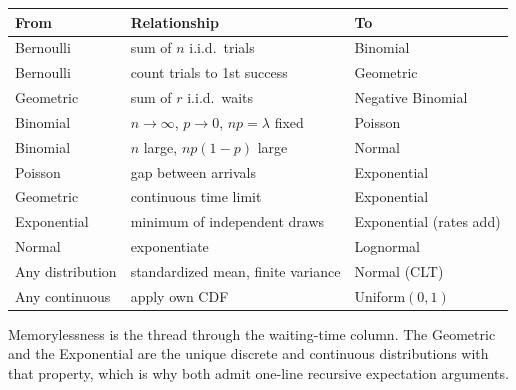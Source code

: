 \begin{keybox}
\begin{center}
\begin{tabular}{@{}lll@{}}
\toprule
\textbf{From} & \textbf{Relationship} & \textbf{To} \\
\midrule
Bernoulli & sum of $n$ i.i.d.\ trials & Binomial \\[0.3em]
Bernoulli & count trials to 1st success & Geometric \\[0.3em]
Geometric & sum of $r$ i.i.d.\ waits & Negative Binomial \\[0.3em]
Binomial & $n \to \infty$, $p \to 0$, $np = \lambda$ fixed & Poisson \\[0.3em]
Binomial & $n$ large, $np(1-p)$ large & Normal \\[0.3em]
Poisson & gap between arrivals & Exponential \\[0.3em]
Geometric & continuous time limit & Exponential \\[0.3em]
Exponential & minimum of independent draws & Exponential (rates add) \\[0.3em]
Normal & exponentiate & Lognormal \\[0.3em]
Any distribution & standardized mean, finite variance & Normal (CLT) \\[0.3em]
Any continuous & apply own CDF & Uniform$(0,1)$ \\
\bottomrule
\end{tabular}
\end{center}

\vspace{2ex}

Memorylessness is the thread through the waiting-time column. The Geometric and the Exponential are the unique discrete and continuous distributions with that property, which is why both admit one-line recursive expectation arguments.
\end{keybox}
